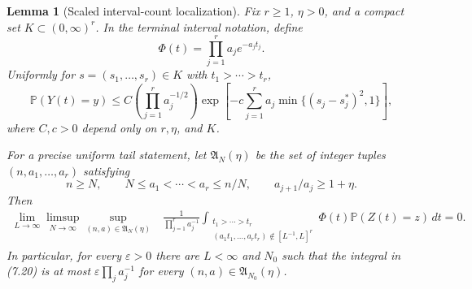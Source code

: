 \documentclass[11pt]{article}
\newtheorem{lemma}[theorem]{Lemma}
\theoremstyle{remark}
\newcommand{\Pp}{\mathbb P}
\newcommand{\dd}{\,d}
\begin{document}
\begin{lemma}[Scaled interval-count localization]
\label{lem:terminal-interval-tilt}
Fix $r\ge1$, $\eta>0$, and a compact set $K\subset(0,\infty)^r$.  In the
terminal interval notation, define
\[
        \Phi(t)=\prod_{j=1}^r a_j e^{-a_jt_j}.
\]
Uniformly for $s=(s_1,\ldots,s_r)\in K$ with $t_1>\cdots>t_r$,
\[
        \Pp(Y(t)=y)
        \le C\left(\prod_{j=1}^r a_j^{-1/2}\right)
        \exp\left[-c\sum_{j=1}^r
        a_j\min\{(s_j-s_j^*)^2,1\}\right],
        \tag{7.19}
\]
where $C,c>0$ depend only on $r,\eta$, and $K$.

For a precise uniform tail statement, let $\mathfrak A_N(\eta)$ be the set of
integer tuples $(n,a_1,\ldots,a_r)$ satisfying
\[
        n\ge N,\qquad
        N\le a_1<\cdots<a_r\le n/N,
        \qquad a_{j+1}/a_j\ge1+\eta.
\]
Then
\[
\begin{aligned}
\lim_{L\to\infty}\limsup_{N\to\infty}
\sup_{(n,a)\in\mathfrak A_N(\eta)}
&\frac{1}{\prod_{j=1}^r a_j^{-1}}
\int_{\substack{t_1>\cdots>t_r\\
        (a_1t_1,\ldots,a_rt_r)\notin[L^{-1},L]^r}}
        \Phi(t)\Pp(Z(t)=z)\dd t
=0.
\end{aligned}\tag{7.20}
\]
In particular, for every $\varepsilon>0$ there are $L<\infty$ and $N_0$ such
that the integral in (7.20) is at most
$\varepsilon\prod_j a_j^{-1}$ for every
$(n,a)\in\mathfrak A_{N_0}(\eta)$.
\end{lemma}
\end{document}
